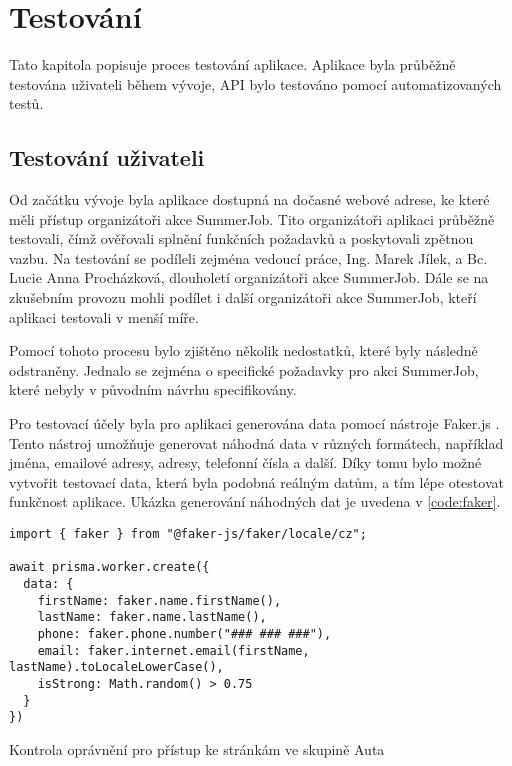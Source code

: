 \chapter{Testování}

Tato kapitola popisuje proces testování aplikace. Aplikace byla průběžně testována uživateli během vývoje, API bylo testováno pomocí automatizovaných testů.

\section{Testování uživateli}

Od začátku vývoje byla aplikace dostupná na dočasné webové adrese, ke které měli přístup organizátoři akce SummerJob. Tito organizátoři aplikaci průběžně testovali,
čímž ověřovali splnění funkčních požadavků a poskytovali zpětnou vazbu. Na testování se podíleli zejména vedoucí práce, Ing. Marek Jílek, a Bc. Lucie Anna Procházková,
dlouholetí organizátoři akce SummerJob. Dále se na zkušebním provozu mohli podílet i další organizátoři akce SummerJob, kteří aplikaci testovali v menší míře.

Pomocí tohoto procesu bylo zjištěno několik nedostatků, které byly následně odstraněny. Jednalo se zejména o specifické požadavky pro akci SummerJob, které nebyly
v původním návrhu specifikovány. 

Pro testovací účely byla pro aplikaci generována data pomocí nástroje Faker.js \cite{fakerjs}. Tento nástroj umožňuje generovat náhodná data v různých formátech, například jména,
emailové adresy, adresy, telefonní čísla a další. Díky tomu bylo možné vytvořit testovací data, která byla podobná reálným datům, a tím lépe otestovat
funkčnost aplikace. Ukázka generování náhodných dat je uvedena v \ref{code:faker}.

\begin{listing}[h]
  \begin{verbatim}
import { faker } from "@faker-js/faker/locale/cz";

await prisma.worker.create({
  data: {
    firstName: faker.name.firstName(),
    lastName: faker.name.lastName(),
    phone: faker.phone.number("### ### ###"),
    email: faker.internet.email(firstName, lastName).toLocaleLowerCase(),
    isStrong: Math.random() > 0.75
  }
})
    \end{verbatim}
    \caption{Kontrola oprávnění pro přístup ke stránkám ve skupině Auta}
    \label{code:faker}
\end{listing}

